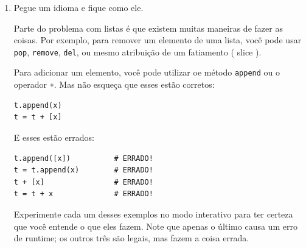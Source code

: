 \begin{enumerate}


\item Pegue um idioma e fique como ele.


Parte do problema com listas é que existem muitas maneiras 
de fazer as coisas. Por exemplo, para remover um elemento
de uma lista, você pode usar {\tt pop}, {\tt remove}, {\tt del},
ou mesmo atribuição de um fatiamento ( slice ).

Para adicionar um elemento, você pode utilizar oe método {\tt append} 
ou o operador {\tt +}. Mas não esqueça que esses estão corretos:



\beforeverb
\begin{verbatim}
t.append(x)
t = t + [x]
\end{verbatim}
\afterverb

E esses estão errados:

\beforeverb
\begin{verbatim}
t.append([x])          # ERRADO!
t = t.append(x)        # ERRADO!
t + [x]                # ERRADO!
t = t + x              # ERRADO!
\end{verbatim}
\afterverb

Experimente cada um desses exemplos no modo interativo para ter
certeza que você entende o que eles fazem. Note que apenas o último
causa um erro de runtime; os outros três são legais, mas fazem a coisa
errada.


\end{enumerate}
